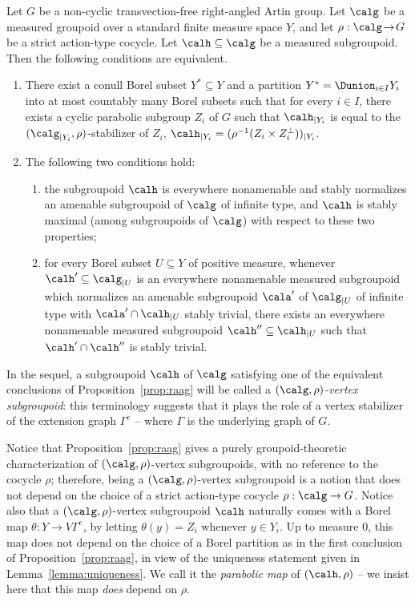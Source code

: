 \begin{prop}
\label{prop:raag}
Let $G$ be a non-cyclic transvection-free right-angled Artin group. Let $\calg$ be a measured groupoid over a standard finite measure space $Y$, and let \hbox{$\rho:\calg\!\to\!G$} be a strict action-type cocycle. Let $\calh\subseteq\calg$ be a measured subgroupoid. Then the following conditions are equivalent.
\begin{enumerate}
\item\label{prop:raag1} There exist a conull Borel subset $Y^*\subseteq Y$ and a partition $Y^*=\Dunion_{i\in I}Y_i$ into at most countably many Borel subsets such that for every $i\in I$, there exists a cyclic parabolic subgroup $Z_i$ of $G$ such that $\calh_{|Y_i}$ is equal to the $(\calg_{|Y_i},\rho)$-stabilizer of $Z_i$, \ie $\calh_{|Y_i}=(\rho^{-1}(Z_i\times Z_i^{\perp}))_{|Y_i}$.
\item\label{prop:raag2} The following two conditions hold:
\begin{enumerate}
\item\label{prop:raag2a} the subgroupoid $\calh$ is everywhere nonamenable and stably normalizes an amenable subgroupoid of $\calg$ of infinite type, and $\calh$ is stably maximal (among subgroupoids of $\calg$) with respect to these two properties;
\item\label{prop:raag2b} for every Borel subset $U\subseteq Y$ of positive measure, whenever $\calh'\subseteq\calg_{|U}$ is an everywhere nonamenable measured subgroupoid which normalizes an amenable subgroupoid $\cala'$ of $\calg_{|U}$ of infinite type with $\cala'\cap\calh_{|U}$ stably trivial, there exists an everywhere nonamenable measured subgroupoid $\calh''\subseteq\calh_{|U}$ such that $\calh'\cap\calh''$ is stably trivial.
\end{enumerate}
\end{enumerate}
\end{prop}

In the sequel, a subgroupoid $\calh$ of $\calg$ satisfying one of the equivalent conclusions of Proposition~\ref{prop:raag} will be called a \emph{$(\calg,\rho)$-vertex subgroupoid}: this terminology suggests that it plays the role of a vertex stabilizer of the extension graph $\Gamma^e$ -- where $\Gamma$ is the underlying graph of $G$.

Notice that Proposition~\ref{prop:raag} gives a purely groupoid-theoretic characterization of $(\calg,\rho)$-vertex subgroupoids, with no reference to the cocycle $\rho$; therefore, being a $(\calg,\rho)$-vertex subgroupoid is a notion that does not depend on the choice of a strict action-type cocycle $\rho:\calg\to G$. Notice also that a $(\calg,\rho)$-vertex subgroupoid $\calh$ naturally comes with a Borel map $\theta:Y\to V\Gamma^e$, by letting $\theta(y)=Z_i$ whenever $y\in Y_i$. Up to measure $0$, this map does not depend on the choice of a Borel partition as in the first conclusion of Proposition~\ref{prop:raag}, in view of the uniqueness statement given in Lemma~\ref{lemma:uniqueness}. We call it the \emph{parabolic map} of $(\calh,\rho)$ -- we insist here that this map \emph{does} depend on $\rho$.

